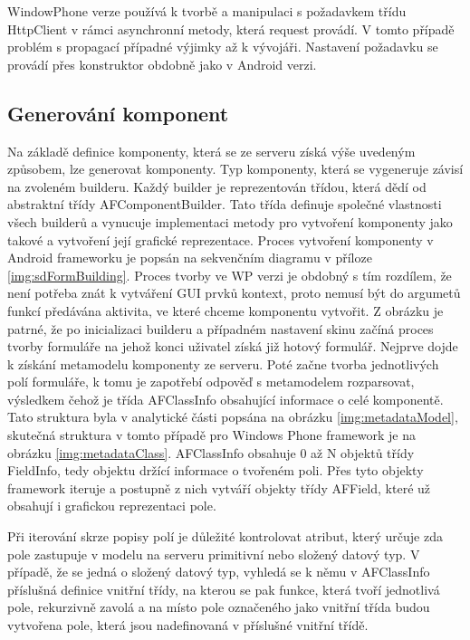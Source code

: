 WindowPhone verze používá k tvorbě a manipulaci s požadavkem třídu HttpClient \cite{wp-httpclient} v rámci asynchronní metody, která request provádí. V tomto případě problém s propagací případné výjimky až k vývojáři. Nastavení požadavku se provádí přes konstruktor obdobně jako v Android verzi. 

\subsection{Generování komponent}
Na základě definice komponenty, která se ze serveru získá výše uvedeným způsobem, lze generovat komponenty. Typ komponenty, která se vygeneruje závisí na zvoleném builderu. Každý builder je reprezentován třídou, která dědí od abstraktní třídy AFComponentBuilder. Tato třída definuje společné vlastnosti všech builderů a  vynucuje implementaci metody pro vytvoření komponenty jako takové a vytvoření její grafické reprezentace. Proces vytvoření komponenty v Android frameworku je popsán na sekvenčním diagramu v příloze \ref{img:sdFormBuilding}. Proces tvorby ve WP verzi je obdobný s tím rozdílem, že není potřeba znát k vytváření GUI prvků kontext, proto nemusí být do argumetů funkcí předávána aktivita, ve které chceme komponentu vytvořit. Z obrázku je patrné, že po inicializaci builderu a případném nastavení skinu začíná proces tvorby formuláře na jehož konci uživatel získá již hotový formulář. Nejprve dojde k získání metamodelu komponenty ze serveru. Poté začne tvorba jednotlivých polí formuláře, k tomu je zapotřebí odpověď s metamodelem rozparsovat, výsledkem čehož je třída AFClassInfo obsahující informace o celé komponentě. Tato struktura byla v analytické části popsána na obrázku \ref{img:metadataModel}, skutečná struktura v tomto případě pro Windows Phone framework je na obrázku \ref{img:metadataClass}. AFClassInfo obsahuje 0 až N objektů třídy FieldInfo, tedy objektu držící informace o tvořeném poli. Přes tyto objekty framework iteruje a postupně z nich vytváří objekty třídy AFField, které už obsahují i grafickou reprezentaci pole. 

Při iterování skrze popisy polí je důležité kontrolovat atribut, který určuje zda pole zastupuje v modelu na serveru primitivní nebo složený datový typ. V případě, že se jedná o složený datový typ, vyhledá se k němu v AFClassInfo příslušná definice vnitřní třídy, na kterou se pak funkce, která tvoří jednotlivá pole, rekurzivně zavolá a na místo pole označeného jako vnitřní třída budou vytvořena pole, která jsou nadefinovaná v příslušné vnitřní třídě. 


